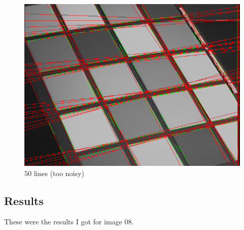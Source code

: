\begin{enumroman}
\begin{figure}[H]
\begin{minipage}{0.4\textwidth}
        \includegraphics[width=\textwidth]{images/01-numlines-50.png}
        \caption{$50$ lines (too noisy)}
        \label{fig:lines-50}
      \end{minipage}
    \end{figure}
\end{enumroman}

\newpage
\subsection{Results}

These were the results I got for image 08.

